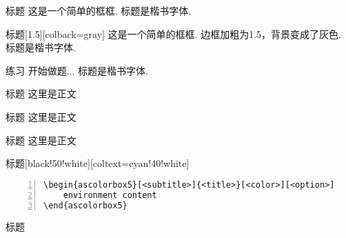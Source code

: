 \documentclass[a4]{ctexart}
\begin{document}
\begin{tcblisting}{}
    \begin{simplesquarebox}[子标题]{标题}
        这是一个简单的框框. 标题是楷书字体.
    \end{simplesquarebox}
\end{tcblisting}

\begin{tcblisting}{}
    \begin{simplesquarebox}[子标题]{标题}[1.5][colback=gray]
        这是一个简单的框框. 边框加粗为1.5，背景变成了灰色. 标题是楷书字体.
    \end{simplesquarebox}
\end{tcblisting}


\begin{tcblisting}{}
   \begin{practicebox}{练习}
        开始做题... 标题是楷书字体.
    \end{practicebox}
\end{tcblisting}




\begin{ascolorbox1}[子标题]{标题}
    这里是正文
\end{ascolorbox1}
\begin{tcblisting}{}
\begin{ascolorbox1}[子标题]{标题}
    这里是正文
\end{ascolorbox1}
\end{tcblisting}

\begin{tcblisting}{}
\begin{ascolorbox3}{标题}
    这里是正文
\end{ascolorbox3}
\end{tcblisting}

\begin{ascolorbox5}[子标题]{标题}[black!50!white][coltext=cyan!40!white]
    \zhlipsum[1]
\end{ascolorbox5}
\begin{lstlisting}[backgroundcolor=\color{gray!5},framerule=1pt,frame=tb,numbers=left,
    numberstyle=\tiny\color{black},]
\begin{ascolorbox5}[<subtitle>]{<title>}[<color>][<option>]
    environment content
\end{ascolorbox5}
\end{lstlisting}

\begin{tcblisting}{}
\begin{ascolorbox8}{标题}
    \zhlipsum[2]
\end{ascolorbox8}
\end{tcblisting}
\end{document}
